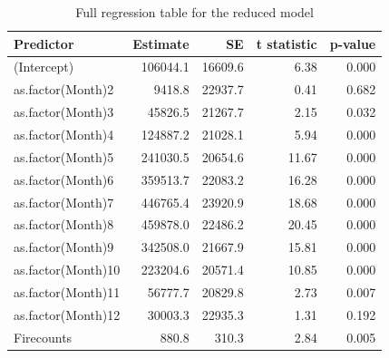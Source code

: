 \documentclass[
  12pt,
]{article}
\begin{document}
\begin{table}

\caption{\label{tab:regressionF}Full regression table for the reduced model}
\centering
\begin{tabular}[t]{l|r|r|r|r}
\hline
Predictor & Estimate & SE & t statistic & p-value\\
\hline
(Intercept) & 106044.1 & 16609.6 & 6.38 & 0.000\\
\hline
as.factor(Month)2 & 9418.8 & 22937.7 & 0.41 & 0.682\\
\hline
as.factor(Month)3 & 45826.5 & 21267.7 & 2.15 & 0.032\\
\hline
as.factor(Month)4 & 124887.2 & 21028.1 & 5.94 & 0.000\\
\hline
as.factor(Month)5 & 241030.5 & 20654.6 & 11.67 & 0.000\\
\hline
as.factor(Month)6 & 359513.7 & 22083.2 & 16.28 & 0.000\\
\hline
as.factor(Month)7 & 446765.4 & 23920.9 & 18.68 & 0.000\\
\hline
as.factor(Month)8 & 459878.0 & 22486.2 & 20.45 & 0.000\\
\hline
as.factor(Month)9 & 342508.0 & 21667.9 & 15.81 & 0.000\\
\hline
as.factor(Month)10 & 223204.6 & 20571.4 & 10.85 & 0.000\\
\hline
as.factor(Month)11 & 56777.7 & 20829.8 & 2.73 & 0.007\\
\hline
as.factor(Month)12 & 30003.3 & 22935.3 & 1.31 & 0.192\\
\hline
Firecounts & 880.8 & 310.3 & 2.84 & 0.005\\
\hline
\end{tabular}
\end{table}
\end{document}
